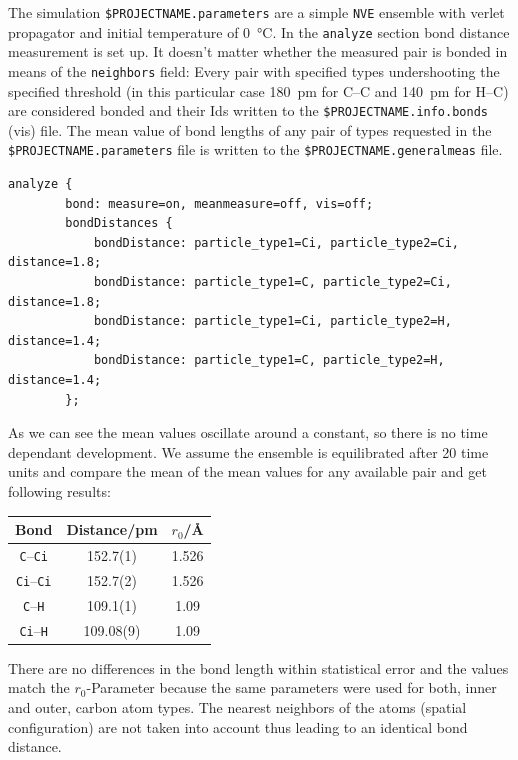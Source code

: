 The simulation \texttt{\$PROJECTNAME.parameters} are a simple \texttt{NVE} ensemble
with verlet propagator and initial temperature of \SI{0}{\celsius}. In the
\texttt{analyze} section bond distance measurement is set up. It
doesn't matter whether the measured pair is bonded in means of the
\texttt{neighbors} field: Every pair with specified types undershooting the
specified threshold (in this particular case \SI{180}{\pico\meter} for C--C and
\SI{140}{\pico\meter} for H--C) are considered bonded and their Ids written to the
\texttt{\$PROJECTNAME.info.bonds} (vis) file. The mean value of bond lengths of any 
pair of types requested in the \texttt{\$PROJECTNAME.parameters} file is written to 
the \texttt{\$PROJECTNAME.generalmeas} file.

\begin{lstlisting}[caption=Excerpt from the .parameters file]
    analyze {
        bond: measure=on, meanmeasure=off, vis=off;
        bondDistances {
            bondDistance: particle_type1=Ci, particle_type2=Ci, distance=1.8;
            bondDistance: particle_type1=C, particle_type2=Ci, distance=1.8;
            bondDistance: particle_type1=Ci, particle_type2=H, distance=1.4;
            bondDistance: particle_type1=C, particle_type2=H, distance=1.4;
        };
\end{lstlisting}

As we can see the mean values oscillate around a constant, so there is
no time dependant development. We assume the ensemble is equilibrated
after 20 time units and compare the mean of the mean values for any
available pair and get following results:

\begin{center}
    \begin{tabular}{ccc}
        \toprule
        Bond & Distance/\si{\pico\meter} & $r_0$/\si{\angstrom} \\
        \midrule
        \texttt{C}--\texttt{Ci} & 152.7(1) & 1.526 \\
        \texttt{Ci}--\texttt{Ci} & 152.7(2) & 1.526 \\
        \texttt{C}--\texttt{H} & 109.1(1) & 1.09 \\
        \texttt{Ci}--\texttt{H} & 109.08(9) & 1.09 \\
        \bottomrule
    \end{tabular}
\end{center}

There are no differences in the bond length within statistical error and
the values match the $r_0$-Parameter because the same parameters were
used for both, inner and outer, carbon atom types. The nearest neighbors
of the atoms (spatial configuration) are not taken into account thus
leading to an identical bond distance.

